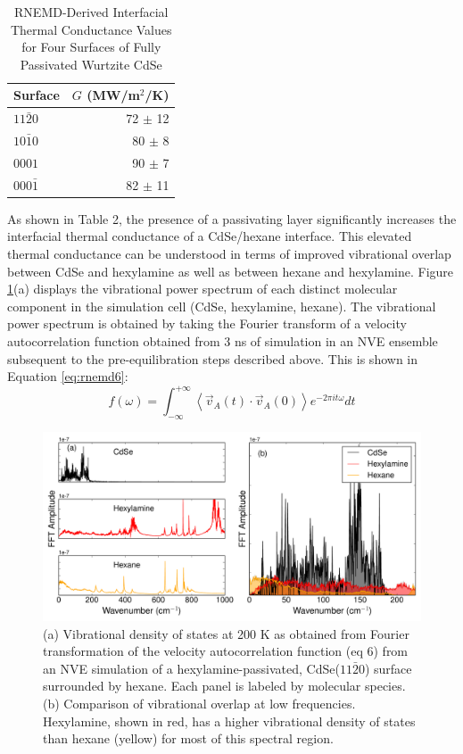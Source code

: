 \begin{table}
\caption{RNEMD-Derived Interfacial Thermal Conductance Values for Four Surfaces of Fully Passivated Wurtzite CdSe}
\centering
\begin{tabular}{l r}
\hline\hline
Surface & $G$ (MW/m$^2$/K) \\
\hline
$11\bar{2}0$ & 72 $\pm$ 12 \\
$10\bar{1}0$ & 80 $\pm$ 8 \\
$0001$ & 90 $\pm$ 7 \\
$000\bar{1}$ & 82 $\pm$ 11 \\
\hline
\end{tabular}
\label{table:rnemdT2}
\end{table}

As shown in Table 2, the presence of a passivating layer significantly increases the interfacial thermal conductance of a CdSe/hexane interface. This elevated thermal conductance can be understood in terms of improved vibrational overlap between CdSe and hexylamine as well as between hexane and hexylamine. Figure \ref{f:rnemd4}(a) displays the vibrational power spectrum of each distinct molecular component in the simulation cell (CdSe, hexylamine, hexane). The vibrational power spectrum is obtained by taking the Fourier transform of a velocity autocorrelation function obtained from 3 ns of simulation in an NVE ensemble subsequent to the pre-equilibration steps described above. This is shown in Equation \ref{eq:rnemd6}:
\begin{equation} \label{eq:rnemd6}
f(\omega) = \int^{+\infty}_{-\infty} \left\langle\vec{v}_A(t) \cdot \vec{v}_A(0)\right\rangle e^{-2\pi it\omega} dt
\end{equation}

\begin{figure}
\begin{center}
\includegraphics[width=\textwidth]{./Chapter4/rnemd4.pdf}
\caption[Vibrational power spectra for hexane, hexylamine, and CdSe.]{(a) Vibrational density of states at 200 K as obtained from Fourier transformation of the velocity autocorrelation function (eq 6) from an NVE simulation of a hexylamine-passivated, CdSe($11\bar{2}0$) surface surrounded by hexane. Each panel is labeled by molecular species. (b) Comparison of vibrational overlap at low frequencies. Hexylamine, shown in red, has a higher vibrational density of states than hexane (yellow) for most of this spectral region.}
\label{f:rnemd4}
\end{center}
\end{figure}


